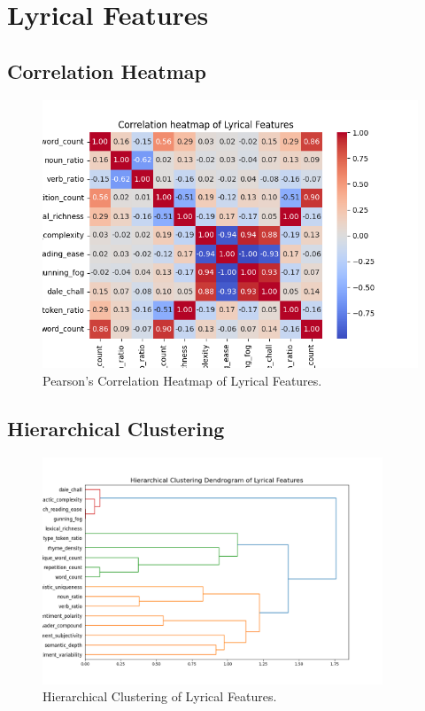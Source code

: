 

\section{Lyrical Features}

\subsection*{Correlation Heatmap}
\label{sec:correlationheatmapsspotifyfeatures}

\begin{center}
\begin{figure}[H]
  \centering
  \includegraphics[width=5in]{img/corr_heatmap_lyrical.png}
  \caption{Pearson's Correlation Heatmap of Lyrical Features.}
  \label{Figure:fig_beh}
\end{figure}
\end{center}

\subsection*{Hierarchical Clustering}
\label{sec:hierarchicalclustering}

\begin{center}
\begin{figure}[H]
  \centering
  \includegraphics[width=4in]{img/dendrogram_lyrical.png}
  \caption{Hierarchical Clustering of Lyrical Features.}
  \label{Figure:dendrogram_spotify_features}
\end{figure}
\end{center}


